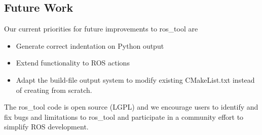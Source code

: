 \documentclass[letterpaper, 10 pt, conference]{ieeeconf}  %
\begin{document}
\subsection{Future Work }
Our current priorities for future improvements to ros\_tool are
\begin{itemize}
 \item Generate correct indentation on Python output
 \item Extend functionality to ROS actions
 \item Adapt the build-file output system to modify existing CMakeList.txt instead of creating from scratch.
\end{itemize}

The ros\_tool code is open source (LGPL) and we encourage users to identify and fix bugs and limitations to ros\_tool and participate in a community effort to simplify ROS development. 
\end{document}
